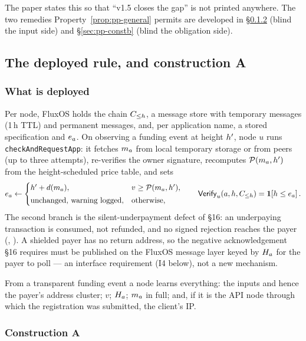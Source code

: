 The paper states this so that ``v1.5 closes the gap'' is not printed anywhere. The two remedies
Property~\ref{prop:pp-general} permits are developed in \S\ref{sec:pp-consta} (blind the input side)
and \S\ref{sec:pp-constb} (blind the obligation side).

\subsection{The deployed rule, and construction A}
\label{sec:pp-deployed}

\subsubsection{What is deployed}

Per node, FluxOS holds the chain $C_{\le h}$, a message store with temporary messages (1\,h TTL) and
permanent messages, and, per application name, a stored specification and $e_{a}$. On observing a
funding event at height $h'$, node $u$ runs \texttt{check\allowbreak{}And\allowbreak{}Request\allowbreak{}App}: it fetches $m_{a}$ from
local temporary storage or from peers (up to three attempts), re-verifies the owner signature,
recomputes $\mathcal{P}(m_{a},h')$ from the height-scheduled price table, and sets
\[
  e_{a} \leftarrow
  \begin{cases}
    h' + d(m_{a}), & v \ge \mathcal{P}(m_{a},h'), \\[2pt]
    \text{unchanged, warning logged}, & \text{otherwise,}
  \end{cases}
  \qquad
  \mathsf{Verify}_u(a,h,C_{\le h}) = \mathbf{1}\!\left[h \le e_{a}\right].
\]
The second branch is the silent-underpayment defect of \S16: an underpaying transaction is consumed,
not refunded, and no signed rejection reaches the payer (\shipped,
). A shielded payer has no return
address, so the negative acknowledgement \S16 requires must be published on the FluxOS message layer
keyed by $H_{a}$ for the payer to poll --- an interface requirement (I4 below), not a new mechanism.

From a transparent funding event a node learns everything: the inputs and hence the payer's address
cluster; $v$; $H_{a}$; $m_{a}$ in full; and, if it is the API node through which the registration
was submitted, the client's IP.

\subsubsection{Construction A}
\label{sec:pp-consta}

